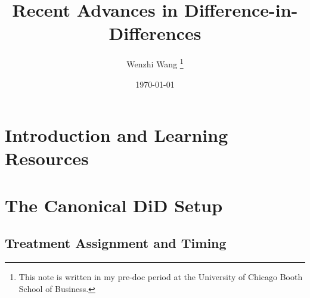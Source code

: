 \documentclass[12pt]{article}
\theoremstyle{definition}
\begin{document}

\title{\bf Recent Advances in Difference-in-Differences}
\author{Wenzhi Wang \thanks{This note is written in my pre-doc period at the University of Chicago Booth School of Business.} } 
\date{\today}
\maketitle




\section{Introduction and Learning Resources}

\citet{rothWhatTrendingDifferenceinDifferences2023} 

\citet{dechaisemartinTwoWayFixedEffects2023}




\section{The Canonical DiD Setup}


\subsection{Treatment Assignment and Timing}
\end{document}
